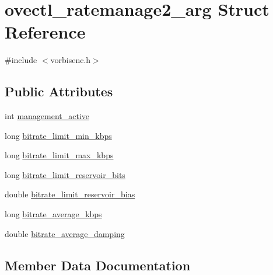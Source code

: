 \hypertarget{structovectl__ratemanage2__arg}{}\section{ovectl\+\_\+ratemanage2\+\_\+arg Struct Reference}
\label{structovectl__ratemanage2__arg}


{\ttfamily \#include $<$vorbisenc.\+h$>$}

\subsection*{Public Attributes}
\begin{DoxyCompactItemize}
\item 
int \hyperlink{structovectl__ratemanage2__arg_aca1f656373a1597177dac924578e375b}{management\+\_\+active}
\item 
long \hyperlink{structovectl__ratemanage2__arg_aeb53a17fff14ec50d143602adfdeabeb}{bitrate\+\_\+limit\+\_\+min\+\_\+kbps}
\item 
long \hyperlink{structovectl__ratemanage2__arg_a175691482003edd7d94592fa2bc993a9}{bitrate\+\_\+limit\+\_\+max\+\_\+kbps}
\item 
long \hyperlink{structovectl__ratemanage2__arg_a75e496acac882e156137de9d1200ebd7}{bitrate\+\_\+limit\+\_\+reservoir\+\_\+bits}
\item 
double \hyperlink{structovectl__ratemanage2__arg_a5567fde1798b1e80e40a77565b4b44f4}{bitrate\+\_\+limit\+\_\+reservoir\+\_\+bias}
\item 
long \hyperlink{structovectl__ratemanage2__arg_a1f6bab60d87143d5060dd6c59aad6e71}{bitrate\+\_\+average\+\_\+kbps}
\item 
double \hyperlink{structovectl__ratemanage2__arg_a1069e148a884d8706928cd2e39870720}{bitrate\+\_\+average\+\_\+damping}
\end{DoxyCompactItemize}


\subsection{Member Data Documentation}
\mbox{\label{structovectl__ratemanage2__arg_a1069e148a884d8706928cd2e39870720}} 
